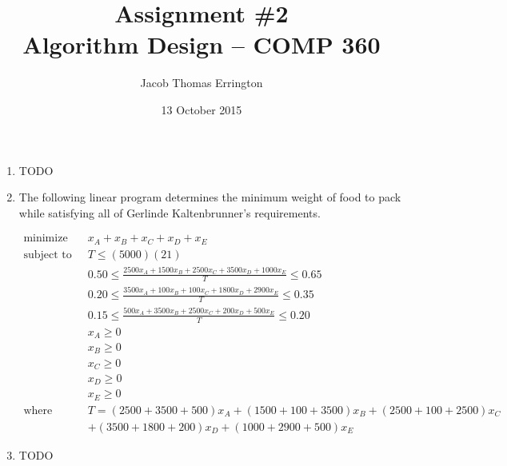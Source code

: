 \documentclass[letterpaper,11pt]{article}
\author{Jacob Thomas Errington}
\title{Assignment \#2 \\ Algorithm Design -- COMP 360}
\date{13 October 2015}
\begin{document}
\maketitle

\begin{enumerate}

    \item TODO


    \item The following linear program determines the minimum weight of food
        to pack while satisfying all of Gerlinde Kaltenbrunner's requirements.

        \begin{align*}
            \text{minimize} \quad
                & x_A + x_B + x_C + x_D + x_E                                                         \\
            \text{subject to} \quad
                & T    \leq (5000)(21)                                                                \\
                & 0.50 \leq \frac{2500x_A + 1500x_B + 2500x_C + 3500x_D + 1000x_E}{T} \leq 0.65       \\
                & 0.20 \leq \frac{3500x_A + 100x_B  + 100x_C  + 1800x_D + 2900x_E}{T} \leq 0.35       \\
                & 0.15 \leq \frac{500x_A  + 3500x_B + 2500x_C + 200x_D  + 500x_E }{T} \leq 0.20       \\
                & x_A  \geq 0                                                                         \\
                & x_B  \geq 0                                                                         \\
                & x_C  \geq 0                                                                         \\
                & x_D  \geq 0                                                                         \\
                & x_E  \geq 0                                                                         \\
            \text{where} \quad
                & T    = (2500 + 3500 + 500) x_A + (1500 + 100 + 3500) x_B + (2500 + 100 + 2500) x_C  \\
                &      + (3500 + 1800 + 200) x_D + (1000 + 2900 + 500) x_E
        \end{align*}

    \item TODO


\end{enumerate}
\end{document}
